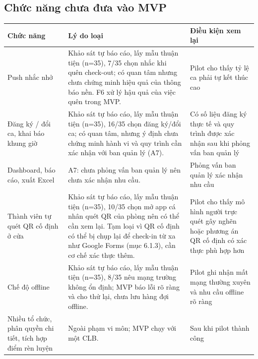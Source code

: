 \subsection{Chức năng chưa đưa vào MVP}
\small
\begin{tabularx}{\textwidth}{|X|X|X|}
\hline
\textbf{Chức năng} & \textbf{Lý do loại} & \textbf{Điều kiện xem lại} \\ \hline
Push nhắc nhở & Khảo sát tự báo cáo, lấy mẫu thuận tiện (n=35), 7/35 chọn nhắc khi quên check-out; có quan tâm nhưng chưa chứng minh hiệu quả của thông báo nền. F6 xử lý hậu quả của việc quên trong MVP. & Pilot cho thấy tỷ lệ ca phải tự kết thúc cao \\ \hline
Đăng ký / đổi ca, khai báo khung giờ & Khảo sát tự báo cáo, lấy mẫu thuận tiện (n=35), 16/35 chọn đăng ký/đổi ca; có quan tâm, nhưng ý định chưa chứng minh hành vi và quy trình cần xác nhận với ban quản lý (A7). & Có số liệu đăng ký thực tế và quy trình được xác nhận sau khi phỏng vấn ban quản lý \\ \hline
Dashboard, báo cáo, xuất Excel & A7: chưa phỏng vấn ban quản lý nên chưa xác nhận nhu cầu. & Phỏng vấn ban quản lý xác nhận nhu cầu \\ \hline
Thành viên tự quét QR cố định ở cửa & Khảo sát tự báo cáo, lấy mẫu thuận tiện (n=35), 10/35 chọn mở app cá nhân quét QR của phòng nên có thể cần xem lại. Tạm loại vì QR cố định có thể bị chụp lại để check-in từ xa như Google Forms (mục 6.1.3), cần cơ chế xác thực thêm. & Pilot cho thấy mô hình người trực quét gây nghẽn hoặc phương án QR cố định có xác thực phù hợp hơn \\ \hline
Chế độ offline & Khảo sát tự báo cáo, lấy mẫu thuận tiện (n=35), 8/35 nêu mạng trường không ổn định; MVP báo lỗi rõ ràng và cho thử lại, chưa lưu hàng đợi offline. & Pilot ghi nhận mất mạng thường xuyên và nhu cầu offline rõ ràng \\ \hline
Nhiều tổ chức, phân quyền chi tiết, tích hợp điểm rèn luyện & Ngoài phạm vi môn; MVP chạy với một CLB.\@ & Sau khi pilot thành công \\ \hline
\end{tabularx}
\normalsize

